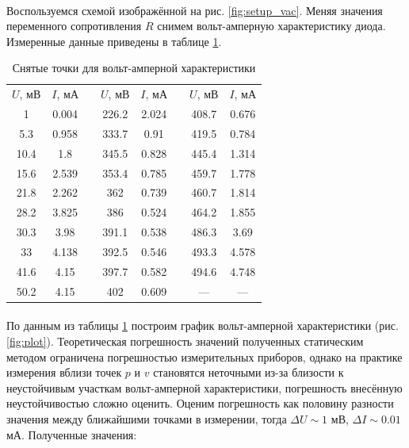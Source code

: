 \documentclass[a4paper,12pt]{article} %
\begin{document}
\paragraph{}  
	Воспользуемся схемой изображённой на рис. \ref{fig:setup_vac}. Меняя значения переменного сопротивления $R$ снимем вольт-амперную характеристику диода. Измеренные данные приведены в таблице \ref{tab:vac}. 

\begin{table}[h]
\centering
\begin{tabular}{|c|c|c|c|c|c|c|c|}
\cline{1-2} \cline{4-5} \cline{7-8}
$U$, мВ & $I$, мА &  & $U$, мВ & $I$, мА &  & $U$, мВ & $I$, мА \\ \cline{1-2} \cline{4-5} \cline{7-8} 
1       & 0.004   &  & 226.2   & 2.024   &  & 408.7   & 0.676   \\ \cline{1-2} \cline{4-5} \cline{7-8} 
5.3     & 0.958   &  & 333.7   & 0.91    &  & 419.5   & 0.784   \\ \cline{1-2} \cline{4-5} \cline{7-8} 
10.4    & 1.8     &  & 345.5   & 0.828   &  & 445.4   & 1.314   \\ \cline{1-2} \cline{4-5} \cline{7-8} 
15.6    & 2.539   &  & 353.4   & 0.785   &  & 459.7   & 1.778   \\ \cline{1-2} \cline{4-5} \cline{7-8} 
21.8    & 2.262   &  & 362     & 0.739   &  & 460.7   & 1.814   \\ \cline{1-2} \cline{4-5} \cline{7-8} 
28.2    & 3.825   &  & 386     & 0.524   &  & 464.2   & 1.855   \\ \cline{1-2} \cline{4-5} \cline{7-8} 
30.3    & 3.98    &  & 391.1   & 0.538   &  & 486.3   & 3.69    \\ \cline{1-2} \cline{4-5} \cline{7-8} 
33      & 4.138   &  & 392.5   & 0.546   &  & 493.3   & 4.578   \\ \cline{1-2} \cline{4-5} \cline{7-8} 
41.6    & 4.15    &  & 397.7   & 0.582   &  & 494.6   & 4.748   \\ \cline{1-2} \cline{4-5} \cline{7-8} 
50.2    & 4.15    &  & 402     & 0.609   &  & ---     & ---     \\ \cline{1-2} \cline{4-5} \cline{7-8} 
\end{tabular}
\caption{Снятые точки для вольт-амперной характеристики}
\label{tab:vac}
\end{table}

\paragraph{}
	По данным из таблицы \ref{tab:vac} построим график вольт-амперной характеристики (рис. \ref{fig:plot}). Теоретическая погрешность значений полученных статическим методом ограничена погрешностью измерительных приборов, однако на практике измерения вблизи точек $p$ и $v$ становятся неточными из-за близости к неустойчивым участкам вольт-амперной характеристики, погрешность внесённую неустойчивостью сложно оценить. Оценим погрешность как половину разности значения между ближайшими точками в измерении, тогда $\Delta U \sim 1$ мВ, $\Delta I \sim 0.01$ мА. Полученные значения:
	
\end{document}
